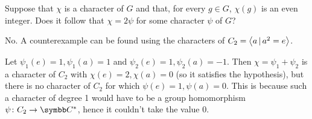 \begin{exercise}
Suppose that \(\chi\) is a character of \(G\) and that, for every \(g \in G\), \(\chi(g)\) is an even integer. Does it follow that \(\chi = 2\psi\) for some character \(\psi\) of \(G\)?
\end{exercise}
\begin{solution}
No. A counterexample can be found using the characters of \(C_2 = \left\langle a \, | \, a^2 = e\right\rangle\).

Let \(\psi_1 (e) = 1, \psi_1 (a) = 1\) and \(\psi_2 (e) = 1, \psi_2 (a) = -1\). Then \(\chi = \psi_1 + \psi_2\) is a character of \(C_2\) with \(\chi (e) = 2, \chi (a) = 0\) (so it satisfies the hypothesis), but there is no character of \(C_2\) for which \(\psi (e) = 1, \psi(a) = 0\). This is because such a character of degree 1 would have to be a group homomorphism \(\psi \colon C_2 \to \complex^*\), hence it couldn't take the value \(0\).
\end{solution}